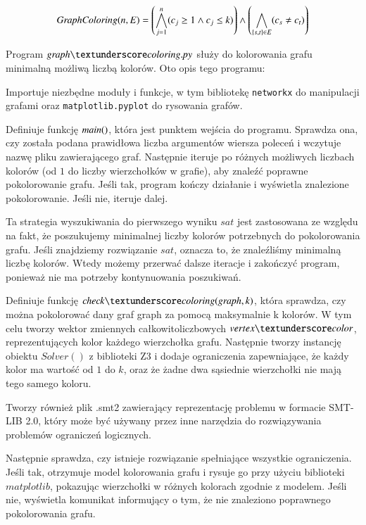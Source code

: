 \begin{align*}
	{\mathit{GraphColoring}}(n, E) = \left( \bigwedge_{j=1}^{n} (c_j \geq 1 \land c_j \leq k) \right) \land 
	\left( \bigwedge_{\{s,t\} \in E} (c_s \neq c_t) \right)
\end{align*}

Program $\graphcoloring$ służy do kolorowania grafu minimalną możliwą liczbą kolorów. Oto opis tego programu:

Importuje niezbędne moduły i funkcje, w tym bibliotekę \texttt{networkx} do manipulacji grafami oraz \texttt{matplotlib.pyplot} do rysowania grafów.

Definiuje funkcję ${\mathit{main()}}$, która jest punktem wejścia do programu. Sprawdza ona, czy została podana prawidłowa liczba argumentów wiersza poleceń i wczytuje nazwę pliku zawierającego graf. Następnie iteruje po różnych możliwych liczbach kolorów (od $1$ do liczby wierzchołków w grafie), aby znaleźć poprawne pokolorowanie grafu. Jeśli tak, program kończy działanie i wyświetla znalezione pokolorowanie. Jeśli nie, iteruje dalej.

Ta strategia wyszukiwania do pierwszego wyniku $sat$ jest zastosowana ze względu na fakt, że poszukujemy minimalnej liczby kolorów potrzebnych do pokolorowania grafu. Jeśli znajdziemy rozwiązanie $sat$, oznacza to, że znaleźliśmy minimalną liczbę kolorów. Wtedy możemy przerwać dalsze iteracje i zakończyć program, ponieważ nie ma potrzeby kontynuowania poszukiwań.



Definiuje funkcję $\checkcoloring$, która sprawdza, czy można pokolorować dany graf graph za pomocą maksymalnie k kolorów. W tym celu tworzy wektor zmiennych całkowitoliczbowych $vertex\textunderscore color$, reprezentujących kolor każdego wierzchołka grafu. Następnie tworzy instancję obiektu $Solver()$ z biblioteki Z3 i dodaje ograniczenia zapewniające, że każdy kolor ma wartość od $1$ do $k$, oraz że żadne dwa sąsiednie wierzchołki nie mają tego samego koloru.

Tworzy również plik .smt2 zawierający reprezentację problemu w formacie SMT-LIB 2.0, który może być używany przez inne narzędzia do rozwiązywania problemów ograniczeń logicznych.

Następnie sprawdza, czy istnieje rozwiązanie spełniające wszystkie ograniczenia. Jeśli tak, otrzymuje model kolorowania grafu i rysuje go przy użyciu biblioteki $matplotlib$, pokazując wierzchołki w różnych kolorach zgodnie z modelem. Jeśli nie, wyświetla komunikat informujący o tym, że nie znaleziono poprawnego pokolorowania grafu.

